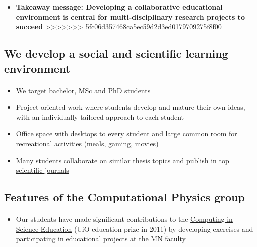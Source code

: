 \documentclass[%
<<<<<<< HEAD
oneside,                 %
final,                   %
=======
twoside,                 %
final,                   %
>>>>>>> 5fc06d357468ca5ec59d2d3ed0179709275f8f00
10pt]{article}
\begin{document}
\begin{itemize}
\begin{itemize}
\noindent
\item \textbf{Takeaway message: Developing a collaborative educational environment is central for multi-disciplinary research projects to succeed}
>>>>>>> 5fc06d357468ca5ec59d2d3ed0179709275f8f00
\end{itemize}

\noindent





\subsection*{We develop a social and scientific learning environment}


\paragraph{}
\begin{itemize}
\item We target bachelor, MSc and PhD students

\item Project-oriented work where students develop and mature their own ideas, with an individually tailored approach to each student

\item Office space with desktops to every student and large common room for recreational activities (meals, gaming, movies)

\item Many students collaborate on similar  thesis topics and \href{{http://www.dn.no/talent/2014/06/12/Utdannelse/sommervikar-ble-toppforsker}}{publish in top scientific journals}
\end{itemize}

\noindent





\subsection*{Features of the Computational Physics group}

\paragraph{}
\begin{itemize}
\item Our students have made significant contributions to  the \href{{http://www.mn.uio.no/english/about/collaboration/cse/}}{Computing in Science Education}  (UiO education prize in 2011) by developing exercises and participating in educational projects at the MN faculty


\end{itemize}
\end{itemize}
\end{document}
